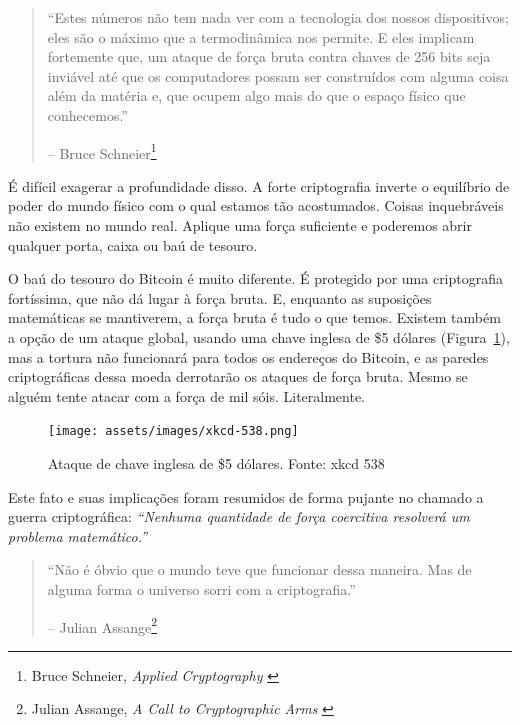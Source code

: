 \begin{quotation}\begin{samepage}
\enquote{Estes números não tem nada ver com a tecnologia dos nossos dispositivos; eles são o máximo que a termodinâmica nos permite. E eles implicam fortemente que, um ataque de força bruta contra chaves de 256 bits seja inviável até que os computadores possam ser construídos com alguma coisa além da matéria e, que ocupem algo mais do que o espaço físico que conhecemos.}
\begin{flushright} -- Bruce Schneier\footnote{Bruce Schneier, \textit{Applied Cryptography} \cite{bruce-schneier}}
\end{flushright}\end{samepage}\end{quotation}

É difícil exagerar a profundidade disso. A forte criptografia inverte o equilíbrio de poder do mundo físico com o qual estamos tão acostumados. Coisas inquebráveis não existem no mundo real. Aplique uma força suficiente e poderemos abrir qualquer porta, caixa ou baú de tesouro.

O baú do tesouro do Bitcoin é muito diferente. É protegido por uma criptografia fortíssima, que não dá lugar à força bruta. E, enquanto as suposições matemáticas se mantiverem, a força bruta é tudo o que temos. Existem também a opção de um ataque global, usando uma chave inglesa de \$5 dólares (Figura~\ref{fig:xkcd-538}), mas a tortura não funcionará para todos os endereços do Bitcoin, e as paredes criptográficas dessa moeda derrotarão os ataques de força bruta. Mesmo se alguém tente atacar com a força de mil sóis. Literalmente.

\begin{figure}
  \centering
  \texttt{[image: assets/images/xkcd-538.png]}
  \caption{Ataque de chave inglesa de \$5 dólares. Fonte: xkcd 538}
  \label{fig:xkcd-538}
\end{figure}

Este fato e suas implicações foram resumidos de forma pujante no chamado a guerra criptográfica: \textit{\enquote{Nenhuma quantidade de força coercitiva resolverá um problema matemático.}}

\begin{quotation}\begin{samepage}
\enquote{Não é óbvio que o mundo teve que funcionar dessa maneira. Mas de alguma forma o universo sorri com a criptografia.}
\begin{flushright} -- Julian Assange\footnote{Julian Assange, \textit{A Call to Cryptographic Arms} \cite{call-to-cryptographic-arms}}
\end{flushright}\end{samepage}\end{quotation}

